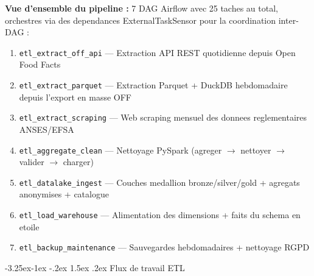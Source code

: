 \documentclass[a4paper,11pt,oneside,openany]{report}
\makeatletter
\renewcommand\subsection{\@startsection{subsection}{2}{\z@}%
  {-3.25ex\@plus -1ex \@minus -.2ex}%
  {1.5ex \@plus .2ex}%
  {\normalfont\large\bfseries\color{ntdarkgreen}}}
\newcommand{\rgpd}{RGPD}
\makeatother
\begin{document}
\textbf{Vue d'ensemble du pipeline :} 7 DAG Airflow avec 25 taches au total,
orchestres via des dependances ExternalTaskSensor pour la coordination
inter-DAG :

\begin{enumerate}[nosep]
  \item \texttt{etl\_extract\_off\_api} --- Extraction API REST quotidienne depuis Open Food Facts
  \item \texttt{etl\_extract\_parquet} --- Extraction Parquet + DuckDB hebdomadaire depuis l'export en masse OFF
  \item \texttt{etl\_extract\_scraping} --- Web scraping mensuel des donnees reglementaires ANSES/EFSA
  \item \texttt{etl\_aggregate\_clean} --- Nettoyage PySpark (agreger $\to$ nettoyer $\to$ valider $\to$ charger)
  \item \texttt{etl\_datalake\_ingest} --- Couches medallion bronze/silver/gold + agregats anonymises + catalogue
  \item \texttt{etl\_load\_warehouse} --- Alimentation des dimensions + faits du schema en etoile
  \item \texttt{etl\_backup\_maintenance} --- Sauvegardes hebdomadaires + nettoyage \rgpd{}
\end{enumerate}

\subsection{Flux de travail ETL}
\end{document}
